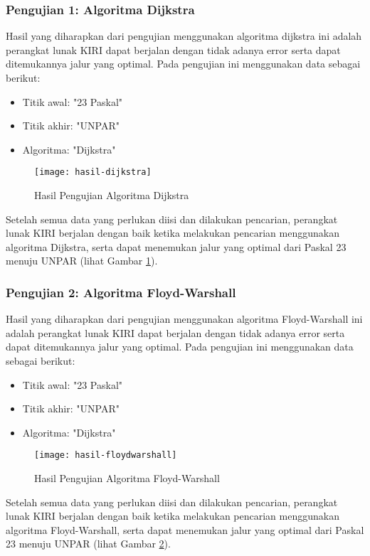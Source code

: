 \newpage
\subsubsection{Pengujian 1: Algoritma Dijkstra}
Hasil yang diharapkan dari pengujian menggunakan algoritma dijkstra ini adalah perangkat lunak KIRI dapat berjalan dengan tidak adanya error serta dapat ditemukannya jalur yang optimal. Pada pengujian ini menggunakan data sebagai berikut:
\begin{itemize}
    \item Titik awal: "23 Paskal"
    \item Titik akhir: "UNPAR"
    \item Algoritma: "Dijkstra"
\end{itemize}

\begin{figure}[H]
    \centering
    \texttt{[image: hasil-dijkstra]}
    \caption{Hasil Pengujian Algoritma Dijkstra}
    \label{fig:hasildijkstra}
\end{figure}
\noindent
Setelah semua data yang perlukan diisi dan dilakukan pencarian, perangkat lunak KIRI berjalan dengan baik ketika melakukan pencarian menggunakan algoritma Dijkstra, serta dapat menemukan jalur yang optimal dari Paskal 23 menuju UNPAR (lihat Gambar \ref{fig:hasildijkstra}).

\subsubsection{Pengujian 2: Algoritma Floyd-Warshall}
Hasil yang diharapkan dari pengujian menggunakan algoritma Floyd-Warshall ini adalah perangkat lunak KIRI dapat berjalan dengan tidak adanya error serta dapat ditemukannya jalur yang optimal. Pada pengujian ini menggunakan data sebagai berikut:
\begin{itemize}
    \item Titik awal: "23 Paskal"
    \item Titik akhir: "UNPAR"
    \item Algoritma: "Dijkstra"
\end{itemize}

\begin{figure}[H]
    \centering
    \texttt{[image: hasil-floydwarshall]}
    \caption{Hasil Pengujian Algoritma Floyd-Warshall}
    \label{fig:hasilfloydwarshall}
\end{figure}
\noindent
Setelah semua data yang perlukan diisi dan dilakukan pencarian, perangkat lunak KIRI berjalan dengan baik ketika melakukan pencarian menggunakan algoritma Floyd-Warshall, serta dapat menemukan jalur yang optimal dari Paskal 23 menuju UNPAR (lihat Gambar \ref{fig:hasilfloydwarshall}).

